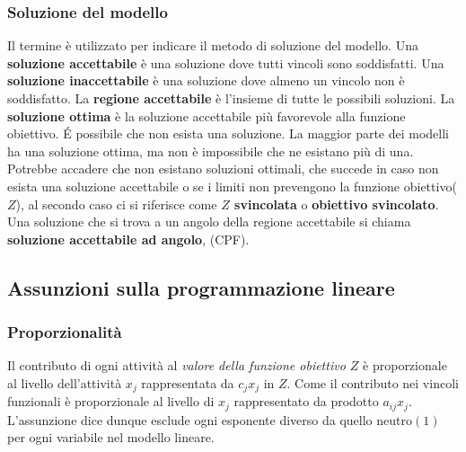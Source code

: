 \documentclass{article}
\begin{document}
    \subsubsection{Soluzione del modello}
      Il termine è utilizzato per indicare il metodo di soluzione del modello. Una \textbf{soluzione accettabile} è una soluzione dove tutti vincoli sono soddisfatti. Una \textbf{soluzione inaccettabile} è una soluzione dove almeno un vincolo non è soddisfatto. La \textbf{regione accettabile} è l'insieme di tutte le possibili soluzioni. La \textbf{soluzione ottima} è la soluzione accettabile più favorevole alla funzione obiettivo. É possibile che non esista una soluzione. La maggior parte dei modelli ha una soluzione ottima, ma non è impossibile che ne esistano più di una. Potrebbe accadere che non esistano soluzioni ottimali, che succede in caso non esista una soluzione accettabile o se i limiti non prevengono la funzione obiettivo($Z$), al secondo caso ci si riferisce come \textbf{$Z$ svincolata} o \textbf{obiettivo svincolato}. Una soluzione che si trova a un angolo della regione accettabile si chiama \textbf{soluzione accettabile ad angolo}, (CPF).

    \subsection{Assunzioni sulla programmazione lineare}
      
      \subsubsection{Proporzionalità}
        Il contributo di ogni attività al \textit{valore della funzione obiettivo $Z$} è proporzionale al livello dell'attività $x_j$ rappresentata da $c_jx_j$ in $Z$. Come il contributo nei vincoli funzionali è proporzionale al livello di $x_j$ rappresentato da prodotto $a_{ij}x_j$. L'assunzione dice dunque esclude ogni esponente diverso da quello neutro$(1)$ per ogni variabile nel modello lineare.
\end{document}
